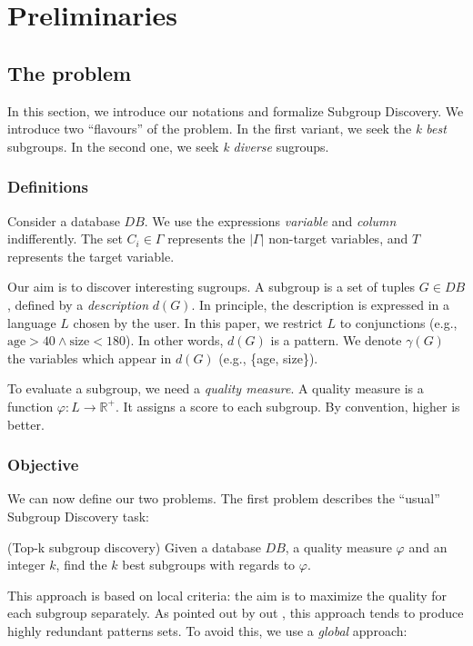 \section{Preliminaries}
\label{sec:preliminaries}

\subsection{The problem}
In this section, we introduce our notations and formalize Subgroup
Discovery. We introduce two ``flavours'' of the problem. In
the first variant, we seek the \emph{k best} subgroups. In the second one,
we seek \emph{k diverse} sugroups.

\subsubsection{Definitions}
Consider a database $DB$. We use the expressions \emph{variable} and
\emph{column} indifferently. The set $C_i \in \Gamma$
represents the $|\Gamma|$ non-target variables, and $T$ represents the target
variable.

Our aim is to discover interesting sugroups. A subgroup is a set of tuples $G
\in DB$, defined by a \emph{description} $d(G)$. In principle, the description
is expressed in a language $L$ chosen by the user. In this paper, we restrict $L$
to conjunctions (e.g., $\text{age} > 40 \wedge \text{size} < 180$). In other
words,  $d(G)$ is a pattern. We denote $\gamma(G)$ the variables which appear
in $d(G)$ (e.g., \{age, size\}).

To evaluate a subgroup, we need a \emph{quality measure}. A quality measure is
a function $\varphi : L \to \mathbb{R}^+ $. It assigns a score to each subgroup.
By convention, higher is better.

\subsubsection{Objective}
We can now define our two problems. The first problem describes the ``usual'' Subgroup
Discovery task:

\begin{problem}
    (Top-k subgroup discovery) Given a database $DB$, a quality measure
    $\varphi$ and an integer $k$, find the $k$ best subgroups with regards to
    $\varphi$.
\end{problem}

This approach is based on local criteria: the aim is to maximize the quality
for each subgroup separately. As pointed out by out  \cite{van2011non}, this
approach tends to produce highly redundant patterns sets. To avoid this, we use
a \emph{global} approach: 

